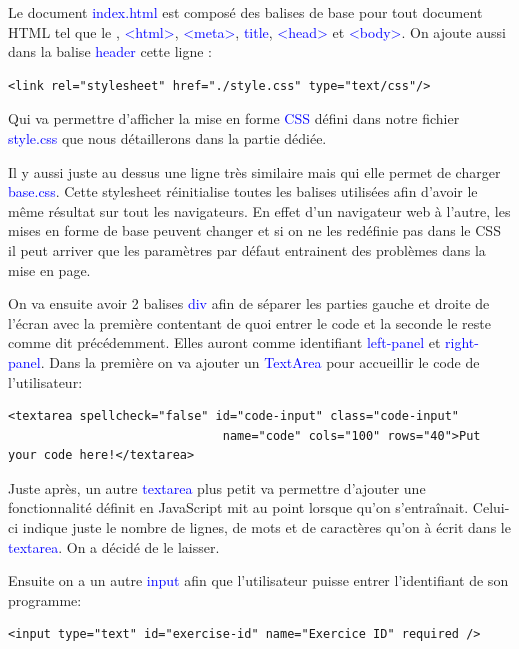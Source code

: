 \documentclass[a4paper]{article}
\renewcommand{\texttt}[2][blue]{\textcolor{#1}{\ttfamily #2}}
\begin{document}
  Le document \texttt{index.html} est composé des balises de base pour tout
  document HTML tel que le \texttt{<DOCTYPE >}, \texttt{<html>},
  \texttt{<meta>}, \texttt{title}, \texttt{<head>} et \texttt{<body>}.  On
  ajoute aussi dans la balise \texttt{header} cette ligne :

  \begin{lstlisting}[language=HTML5]
    <link rel="stylesheet" href="./style.css" type="text/css"/>
  \end{lstlisting}

  Qui va permettre d'afficher la mise en forme \texttt{CSS} défini dans notre
  fichier \texttt{style.css} que nous détaillerons dans la partie dédiée.

  Il y aussi juste au dessus une ligne très similaire mais qui elle permet de
  charger \texttt{base.css}. Cette stylesheet réinitialise toutes les balises
  utilisées afin d'avoir le même résultat sur tout les navigateurs. En effet
  d'un navigateur web à l'autre, les mises en forme de base peuvent changer et
  si on ne les redéfinie pas dans le CSS il peut arriver que les paramètres par
  défaut entrainent des problèmes dans la mise en page.

  On va ensuite avoir 2 balises \texttt{div} afin de séparer les parties
  gauche et droite de l'écran avec la première contentant de quoi entrer le
  code et la seconde le reste comme dit précédemment. Elles auront comme
  identifiant \texttt{left-panel} et \texttt{right-panel}. Dans la première on
  va ajouter un \texttt{TextArea} pour accueillir le code de l'utilisateur:

  \begin{lstlisting}[language=HTML5]
    <textarea spellcheck="false" id="code-input" class="code-input"
                              name="code" cols="100" rows="40">Put your code here!</textarea>
  \end{lstlisting}

  Juste après, un autre \texttt{textarea} plus petit va permettre d'ajouter une
  fonctionnalité définit en JavaScript mit au point lorsque qu'on s'entraînait.
  Celui-ci indique juste le nombre de lignes, de mots et
  de caractères qu'on à écrit dans le \texttt{textarea}. On a décidé de le laisser.

  Ensuite on a un autre \texttt{input} afin que l'utilisateur puisse entrer
  l'identifiant de son programme:

  \begin{lstlisting}[language=HTML5]
    <input type="text" id="exercise-id" name="Exercice ID" required />
  \end{lstlisting}
\end{document}
